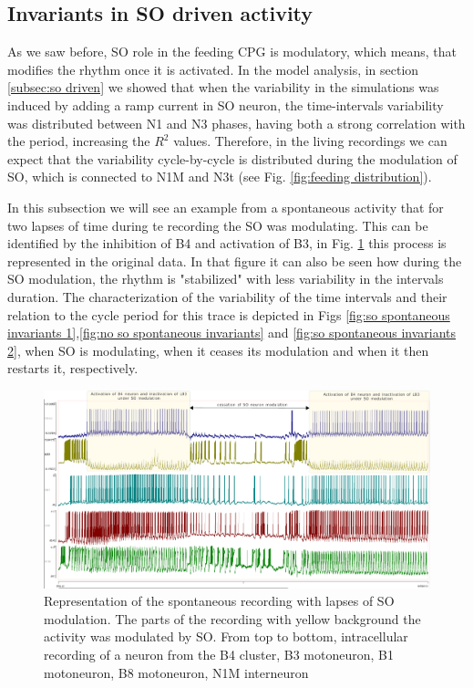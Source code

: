 \subsection{Invariants in SO driven activity}
As we saw before, SO role in the feeding CPG is modulatory, which means, that modifies the rhythm once it is activated. In the model analysis, in section \ref{subsec:so driven} we showed that when the variability in the simulations was induced by adding a ramp current in SO neuron, the time-intervals variability was distributed between N1 and N3 phases, having both a strong correlation with the period, increasing the $R^2$ values. Therefore, in the living recordings we can expect that the variability cycle-by-cycle is distributed during the modulation of SO, which is connected to N1M and N3t (see Fig. \ref{fig:feeding distribution}). 

In this subsection we will see an example from a spontaneous activity that for two lapses of time during te recording the SO was modulating. This can be identified by the inhibition of B4 and activation of B3, in Fig. \ref{fig:SO-spontaneous-driven} this process is represented in the original data. In that figure it can also be seen how during the SO modulation, the rhythm is "stabilized" with less variability in the intervals duration. The characterization of the variability of the time intervals and their relation to the cycle period for this trace is depicted in Figs \ref{fig:so spontaneous invariants 1},\ref{fig:no so spontaneous invariants} and \ref{fig:so spontaneous invariants 2}, when SO is modulating, when it ceases its modulation and when it then restarts it, respectively. 


 \begin{figure}[htbp]
 	\centering
 	\includegraphics[width=\textwidth]{./img/invariants/SO-spontaneuous-driven.pdf}
 	\caption{Representation of the spontaneous recording with lapses of SO modulation. The parts of the recording with yellow background the activity was modulated by SO. From top to bottom, intracellular recording of a neuron from the B4 cluster, B3 motoneuron, B1 motoneuron, B8 motoneuron, N1M interneuron}
 	\label{fig:SO-spontaneous-driven}
 \end{figure}

